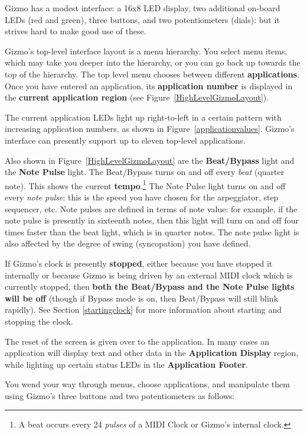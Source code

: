 \documentclass{article}
\begin{document}
Gizmo has a modest interface: a 16x8 LED display, two additional on-board LEDs (red and green), three buttons, and two potentiometers (dials): but it strives hard to make good use of these.  

Gizmo's top-level interface layout is a menu hierarchy.  You select menu items, which may take you deeper into the hierarchy, or you can go back up towards the top of the hierarchy.  The top level menu chooses between different {\bf applications}.  Once you have entered an application, its {\bf application number} is displayed in the {\bf current application region} (see Figure~\ref{HighLevelGizmoLayout}).

The current application LEDs light up right-to-left in a certain pattern with increasing application numbers, as shown in Figure~\ref{applicationvalues}.  Gizmo's interface can presently support up to eleven top-level applications.  

Also shown in Figure~\ref{HighLevelGizmoLayout} are the {\bf Beat/Bypass} light and the {\bf Note Pulse} light.  The Beat/Bypass turns on and off every {\it beat} (quarter note).  This shows the current {\bf tempo}.\footnote{A beat occurs every 24 {\it pulses} of a MIDI Clock or Gizmo's internal clock.}  The Note Pulse light turns on and off every {\it note pulse}: this is the speed you have chosen for the arpeggiator, step sequencer, etc.  Note pulses are defined in terms of note value: for example, if the note pulse is presently in sixteenth notes, then this light will turn on and off four times faster than the beat light, which is in quarter notes. The note pulse light is also affected by the degree of swing (syncopation) you have defined.

If Gizmo's clock is presently {\bf stopped}, either because you have stopped it internally or because Gizmo is being driven by an external MIDI clock which is currently stopped, then {\bf both the Beat/Bypass and the Note Pulse lights will be off} (though if Bypass mode is on, then Beat/Bypass will still blink rapidly).  See Section \ref{startingclock} for more information about starting and stopping the clock.

The reset of the screen is given over to the application.  In many cases an application will display text and other data in the {\bf Application Display} region, while lighting up certain status LEDs in the {\bf Application Footer}.

You wend your way through menus, choose applications, and manipulate them using Gizmo's three buttons and two potentiometers as follows:
\end{document}
